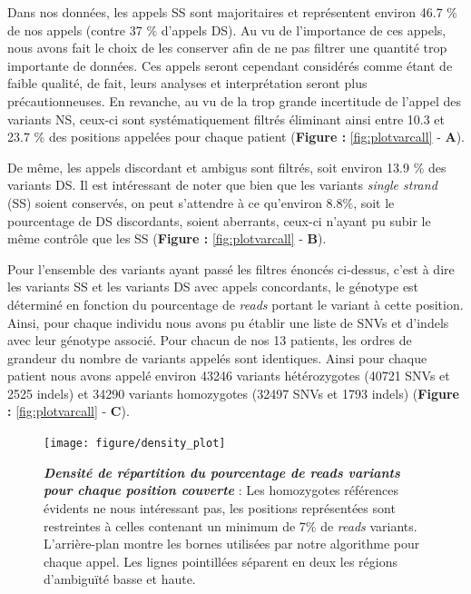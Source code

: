 \documentclass[12pt,a4paper,twoside]{ugathesis}
\theoremstyle{definition}
\theoremstyle{definition}
\theoremstyle{definition}
\theoremstyle{remark}
\begin{document}
Dans nos données, les appels SS sont majoritaires et représentent
environ 46.7 \% de nos appels (contre 37 \% d'appels DS). Au vu de
l'importance de ces appels, nous avons fait le choix de les conserver
afin de ne pas filtrer une quantité trop importante de données. Ces
appels seront cependant considérés comme étant de faible qualité, de
fait, leurs analyses et interprétation seront plus précautionneuses. En
revanche, au vu de la trop grande incertitude de l'appel des variants
NS, ceux-ci sont systématiquement filtrés éliminant ainsi entre 10.3 et
23.7 \% des positions appelées pour chaque patient (\textbf{Figure :
}\ref{fig:plotvarcall} - \textbf{A}).

De même, les appels discordant et ambigus sont filtrés, soit environ
13.9 \% des variants DS. Il est intéressant de noter que bien que les
variants \emph{single strand} (SS) soient conservés, on peut s'attendre
à ce qu'environ 8.8\%, soit le pourcentage de DS discordants, soient
aberrants, ceux-ci n'ayant pu subir le même contrôle que les SS
(\textbf{Figure : }\ref{fig:plotvarcall} - \textbf{B}).

Pour l'ensemble des variants ayant passé les filtres énoncés ci-dessus,
c'est à dire les variants SS et les variants DS avec appels concordants,
le génotype est déterminé en fonction du pourcentage de \emph{reads}
portant le variant à cette position. Ainsi, pour chaque individu nous
avons pu établir une liste de SNVs et d'indels avec leur génotype
associé. Pour chacun de nos 13 patients, les ordres de grandeur du
nombre de variants appelés sont identiques. Ainsi pour chaque patient
nous avons appelé environ 43246 variants hétérozygotes (40721 SNVs et
2525 indels) et 34290 variants homozygotes (32497 SNVs et 1793 indels)
(\textbf{Figure : }\ref{fig:plotvarcall} - \textbf{C}).

\newpage

\begin{figure}

{\centering \texttt{[image: figure/density\_plot]} 

}

\caption[Densité de répartition du pourcentage de
\emph{reads} variants pour chaque position couverte\\]{\textbf{\emph{Densité de répartition du pourcentage
de \emph{reads} variants pour chaque position couverte}} : Les
homozygotes références évidents ne nous intéressant pas, les positions
représentées sont restreintes à celles contenant un minimum de 7\% de
\emph{reads} variants. L'arrière-plan montre les bornes utilisées par
notre algorithme pour chaque appel. Les lignes pointillées séparent en
deux les régions d'ambiguïté basse et haute.}\label{fig:plotdensityvar}
\end{figure}
\end{document}
